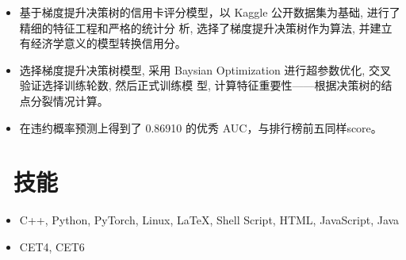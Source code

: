 \documentclass{resume}
\begin{document}
\begin{itemize}
  \item 基于梯度提升决策树的信用卡评分模型，以 Kaggle 公开数据集为基础, 进行了精细的特征工程和严格的统计分
  析, 选择了梯度提升决策树作为算法, 并建立有经济学意义的模型转换信用分。
  \item 选择梯度提升决策树模型, 采用 Baysian Optimization 进行超参数优化, 交叉验证选择训练轮数, 然后正式训练模
  型, 计算特征重要性——根据决策树的结点分裂情况计算。
  \item 在违约概率预测上得到了 0.86910 的优秀 AUC，与排行榜前五同样score。
\end{itemize}


\section{\faCogs\ 技能}
\begin{itemize}[parsep=0.5ex]
  \item C++, Python, PyTorch, Linux, LaTeX, Shell Script, HTML, JavaScript, Java
  \item CET4, CET6
\end{itemize}

%
%
\end{document}
